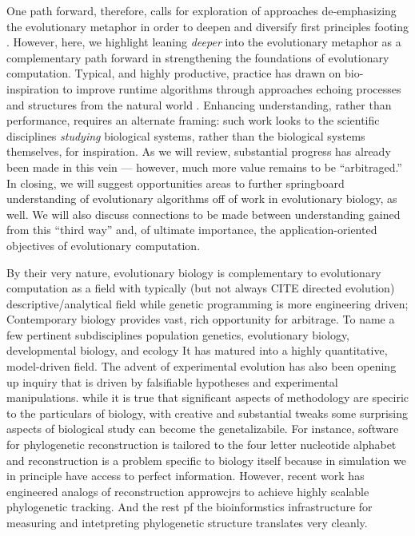 One path forward, therefore, calls for exploration of approaches de-emphasizing the evolutionary metaphor in order to deepen and diversify first principles footing \citep{moore2023evolution}.
However, here, we highlight leaning \textit{deeper} into the evolutionary metaphor as a complementary path forward in strengthening the foundations of evolutionary computation.
Typical, and highly productive, practice has drawn on bio-inspiration to improve runtime algorithms through approaches echoing processes and structures from the natural world \citep{banzhaf2006artificial,kumar2003biologically}.
Enhancing understanding, rather than performance, requires an alternate framing: such work looks to the scientific disciplines \textit{studying} biological systems, rather than the biological systems themselves, for inspiration.
As we will review, substantial progress has already been made in this vein --- however, much more value remains to be ``arbitraged.''
In closing, we will suggest opportunities areas to further springboard understanding of evolutionary algorithms off of work in evolutionary biology, as well.
We will also discuss connections to be made between understanding gained from this ``third way'' and, of ultimate importance, the application-oriented objectives of evolutionary computation.


By their very nature, evolutionary biology is complementary to evolutionary computation as a field with typically (but not always CITE directed evolution) descriptive/analytical field while genetic programming is more engineering driven;
Contemporary biology provides vast, rich opportunity for arbitrage.
To name a few pertinent subdisciplines population genetics, evolutionary biology, developmental biology, and ecology
It has matured into a highly quantitative, model-driven field.
The advent of experimental evolution has also been opening up inquiry that is driven by falsifiable hypotheses and experimental manipulations.
while it is true that significant aspects of methodology are speciric to the particulars of biology, with creative and substantial tweaks some surprising aspects of biological study can become the genetalizabile.
For instance, software for phylogenetic reconstruction is tailored to the four letter nucleotide alphabet and reconstruction is a problem specific to biology itself because in simulation we in principle have access to perfect information.
However, recent work has engineered analogs of reconstruction approwcjrs to achieve highly scalable phylogenetic tracking.
And the rest pf the bioinformstics infrastructure for measuring and intetpreting phylogenetic structure translates very cleanly.

